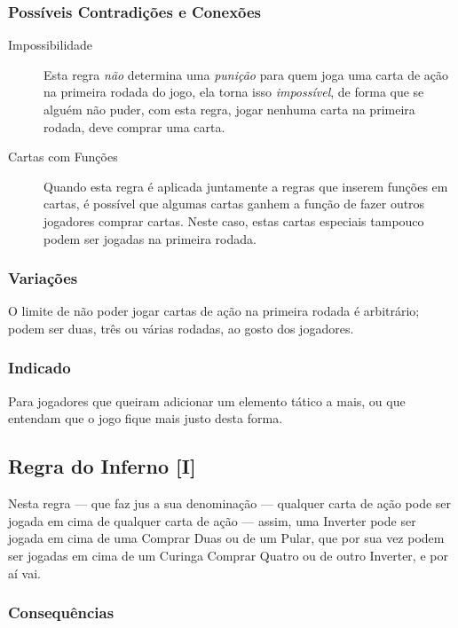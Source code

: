 \subsubsection{Possíveis Contradições e Conexões}

\begin{description}
\item[Impossibilidade]{Esta regra \emph{não} determina uma \emph{punição} para quem joga uma carta de ação na primeira rodada do jogo, ela torna isso \emph{impossível}, de forma que se alguém não puder, com esta regra, jogar nenhuma carta na primeira rodada, deve comprar uma carta.}
\item[Cartas com Funções]{Quando esta regra é aplicada juntamente a regras que inserem funções em cartas, é possível que algumas cartas ganhem a função de fazer outros jogadores comprar cartas. Neste caso, estas cartas especiais tampouco podem ser jogadas na primeira rodada.}
\end{description}

\subsubsection{Variações}

O limite de não poder jogar cartas de ação na primeira rodada é arbitrário; podem ser duas, três ou várias rodadas, ao gosto dos jogadores.

\subsubsection{Indicado} 

Para jogadores que queiram adicionar um elemento tático a mais, ou que entendam que o jogo fique mais justo desta forma.

\subsection{Regra do Inferno [I]}

Nesta regra --- que faz jus a sua denominação --- qualquer carta de ação pode ser jogada em cima de qualquer carta de ação --- assim, uma Inverter pode ser jogada em cima de uma Comprar Duas ou de um Pular, que por sua vez podem ser jogadas em cima de um Curinga Comprar Quatro ou de outro Inverter, e por aí vai.

\subsubsection{Consequências}

